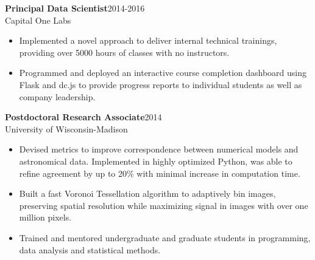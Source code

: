\documentclass[11pt]{res}
\begin{document}
\begin{resume}
{\bf Principal Data Scientist}\hfill\mbox{2014-2016}\\
Capital One Labs
\vspace*{0.01 in}\begin{itemize} \itemsep -2pt 
  \item Implemented a novel approach to deliver internal technical
    trainings, providing over 5000 hours of classes with no instructors.
  \item Programmed and deployed an interactive course completion dashboard using Flask
    and dc.js to provide progress reports to individual students as
    well as company leadership.
  \end{itemize}

\pagebreak
{\bf Postdoctoral Research Associate}\hfill\mbox{2014}\\
University of Wisconsin-Madison
                  \vspace* {0.01 in}\begin{itemize} \itemsep -2pt
                    \item Devised metrics to improve correspondence between numerical models and
                      astronomical data. Implemented in highly
                      optimized Python, was able to refine agreement by
                      up to 20\% with minimal increase in computation time.
                    \item Built a fast Voronoi Tessellation algorithm
                      to adaptively bin images, preserving spatial
                      resolution while maximizing signal in images
                      with over one million pixels.
                    \item Trained and mentored undergraduate and
                      graduate students in programming, data analysis and statistical methods.
                    \end{itemize}


\end{resume}
\end{document}
